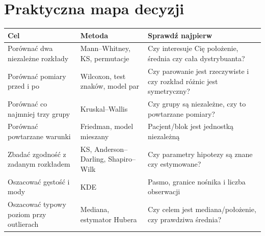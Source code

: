 \section{Praktyczna mapa decyzji}
\begin{center}\small
\begin{tabular}{>{\raggedright\arraybackslash}p{}>{\raggedright\arraybackslash}p{}>{\raggedright\arraybackslash}p{}}
\toprule
\textbf{Cel} & \textbf{Metoda} & \textbf{Sprawdź najpierw}\\
\midrule
Porównać dwa niezależne rozkłady & Mann--Whitney, KS, permutacje & Czy interesuje Cię położenie, średnia czy cała dystrybuanta?\\
Porównać pomiary przed i po & Wilcoxon, test znaków, model par & Czy parowanie jest rzeczywiste i czy rozkład różnic jest symetryczny?\\
Porównać co najmniej trzy grupy & Kruskal--Wallis & Czy grupy są niezależne, czy to powtarzane pomiary?\\
Porównać powtarzane warunki & Friedman, model mieszany & Pacjent/blok jest jednostką niezależną\\
Zbadać zgodność z zadanym rozkładem & KS, Anderson--Darling, Shapiro--Wilk & Czy parametry hipotezy są znane czy estymowane?\\
Oszacować gęstość i mody & KDE & Pasmo, granice nośnika i liczba obserwacji\\
Oszacować typowy poziom przy outlierach & Mediana, estymator Hubera & Czy celem jest mediana/położenie, czy prawdziwa średnia?\\
\bottomrule
\end{tabular}
\end{center}

